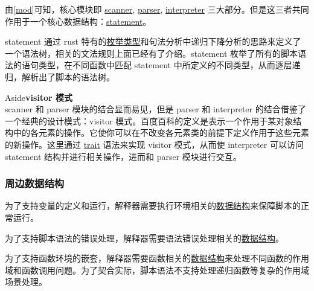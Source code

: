 \documentclass[12pt]{article}
\newenvironment{aside}[1]
    { \begin{tcolorbox}[enlarge top by=0.5cm, enlarge bottom by=0.5cm] Aside\space\space\space\space \textbf{#1} \\
        } { \end{tcolorbox} }
\begin{document}
    由\ref{mod}可知，核心模块即 \href{generate_by_cargo/robot_dsl/scanner/struct.Scanner.html}{scanner}, \href{generate_by_cargo/robot_dsl/scanner/struct.Parser.html}{parser}, \href{generate_by_cargo/robot_dsl/scanner/struct.Interpreter.html}{interpreter} 三大部分。但是这三者共同作用于一个核心数据结构：\href{generate_by_cargo/robot_dsl/syntax/enum.Stmt.html}{statement}。

    statement 通过 rust 特有的\href{https://doc.rust-lang.org/stable/reference/items/enumerations.html}{枚举类型}和句法分析中递归下降分析的思路来定义了一个语法树，相关的文法规则上面已经有了介绍。statement 枚举了所有的脚本语法的语句类型，在不同函数中匹配 statement 中所定义的不同类型，从而逐层递归，解析出了脚本的语法树。

    \begin{aside}{visitor 模式}
        scanner 和 parser 模块的结合显而易见，但是 parser 和 interpreter 的结合借鉴了一个经典的设计模式：visitor 模式。百度百科的定义是表示一个作用于某对象结构中的各元素的操作。它使你可以在不改变各元素类的前提下定义作用于这些元素的新操作。这里通过 \href{https://doc.rust-lang.org/stable/reference/items/traits.html}{trait} 语法来实现 visitor 模式，从而使 interpreter 可以访问 statement 结构并进行相关操作，进而和 parser 模块进行交互。
    \end{aside}

    \subsubsection{周边数据结构}

    为了支持变量的定义和运行，解释器需要执行环境相关的\href{generate_by_cargo/robot_dsl/env/index.html}{数据结构}来保障脚本的正常运行。

    为了支持脚本语法的错误处理，解释器需要语法错误处理相关的\href{generate_by_cargo/robot_dsl/error/index.html}{数据结构}。

    为了支持函数环境的嵌套，解释器需要函数相关的\href{generate_by_cargo/robot_dsl/function/index.html}{数据结构}来处理不同函数的作用域和函数调用问题。为了契合实际，脚本语法不支持处理递归函数等复杂的作用域场景处理。
\end{document}
